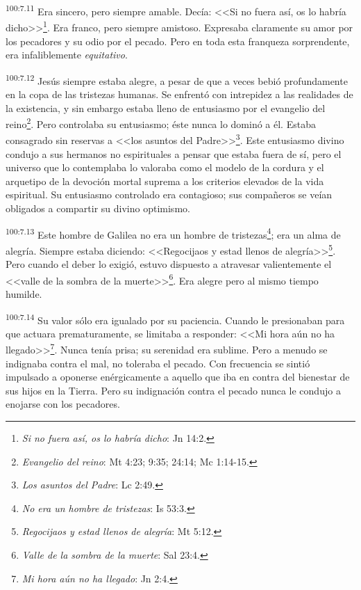\documentclass[twoside, 11pt]{book}
\begin{document}
\par
\textsuperscript{100:7.11} Era sincero, pero siempre amable. Decía: <<Si no fuera así, os lo habría dicho>>\footnote{\textit{Si no fuera así, os lo habría dicho}: Jn 14:2.}. Era franco, pero siempre amistoso. Expresaba claramente su amor por los pecadores y su odio por el pecado. Pero en toda esta franqueza sorprendente, era infaliblemente \textit{equitativo}.

\par
\textsuperscript{100:7.12} Jesús siempre estaba alegre, a pesar de que a veces bebió profundamente en la copa de las tristezas humanas. Se enfrentó con intrepidez a las realidades de la existencia, y sin embargo estaba lleno de entusiasmo por el evangelio del reino\footnote{\textit{Evangelio del reino}: Mt 4:23; 9:35; 24:14; Mc 1:14-15.}. Pero controlaba su entusiasmo; éste nunca lo dominó a él. Estaba consagrado sin reservas a <<los asuntos del Padre>>\footnote{\textit{Los asuntos del Padre}: Lc 2:49.}. Este entusiasmo divino condujo a sus hermanos no espirituales a pensar que estaba fuera de sí, pero el universo que lo contemplaba lo valoraba como el modelo de la cordura y el arquetipo de la devoción mortal suprema a los criterios elevados de la vida espiritual. Su entusiasmo controlado era contagioso; sus compañeros se veían obligados a compartir su divino optimismo.

\par
\textsuperscript{100:7.13} Este hombre de Galilea no era un hombre de tristezas\footnote{\textit{No era un hombre de tristezas}: Is 53:3.}; era un alma de alegría. Siempre estaba diciendo: <<Regocijaos y estad llenos de alegría>>\footnote{\textit{Regocijaos y estad llenos de alegría}: Mt 5:12.}. Pero cuando el deber lo exigió, estuvo dispuesto a atravesar valientemente el <<valle de la sombra de la muerte>>\footnote{\textit{Valle de la sombra de la muerte}: Sal 23:4.}. Era alegre pero al mismo tiempo humilde.

\par
\textsuperscript{100:7.14} Su valor sólo era igualado por su paciencia. Cuando le presionaban para que actuara prematuramente, se limitaba a responder: <<Mi hora aún no ha llegado>>\footnote{\textit{Mi hora aún no ha llegado}: Jn 2:4.}. Nunca tenía prisa; su serenidad era sublime. Pero a menudo se indignaba contra el mal, no toleraba el pecado. Con frecuencia se sintió impulsado a oponerse enérgicamente a aquello que iba en contra del bienestar de sus hijos en la Tierra. Pero su indignación contra el pecado nunca le condujo a enojarse con los pecadores.
\end{document}
